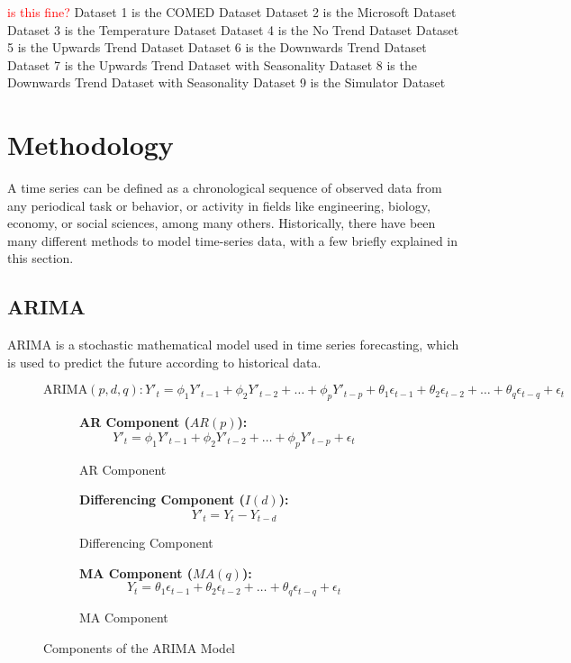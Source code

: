\documentclass[conference]{IEEEtran}
\begin{document}
\textcolor{red}{is this fine?}
Dataset 1 is the COMED Dataset
Dataset 2 is the Microsoft Dataset
Dataset 3 is the Temperature Dataset
Dataset 4 is the No Trend Dataset
Dataset 5 is the Upwards Trend Dataset
Dataset 6 is the Downwards Trend Dataset
Dataset 7 is the Upwards Trend Dataset with Seasonality
Dataset 8 is the Downwards Trend Dataset with Seasonality
Dataset 9 is the Simulator Dataset

\section{Methodology}

A time series can be defined as a chronological sequence of observed data from any periodical task or behavior, or activity in fields like engineering, biology, economy, or social sciences, among many others. Historically, there have been many different methods to model time-series data, with a few briefly explained in this section. 

\subsection{ARIMA}
ARIMA is a stochastic mathematical model used in time series forecasting, which is used to predict the future according to historical data.

\begin{figure}[ht]
  \begin{equation}
    \text{ARIMA}(p, d, q): Y'_t = \phi_1 Y'_{t-1} + \phi_2 Y'_{t-2} + \ldots + \phi_p Y'_{t-p} + \theta_1 \epsilon_{t-1} + \theta_2 \epsilon_{t-2} + \ldots + \theta_q \epsilon_{t-q} + \epsilon_t
  \end{equation}
\end{figure}

\begin{figure}[ht]
  \begin{subfigure}{0.5\textwidth}
    \centering
    \textbf{AR Component ($AR(p)$):}
    \[ Y'_t = \phi_1 Y'_{t-1} + \phi_2 Y'_{t-2} + \ldots + \phi_p Y'_{t-p} + \epsilon_t \]
    \caption{AR Component}
  \end{subfigure}%
  \begin{subfigure}{0.5\textwidth}
    \centering
    \textbf{Differencing Component ($I(d)$):}
    \[ Y'_t = Y_t - Y_{t-d} \]
    \caption{Differencing Component}
  \end{subfigure}

  \begin{subfigure}{\textwidth}
    \centering
    \textbf{MA Component ($MA(q)$):}
    \[ Y_t = \theta_1 \epsilon_{t-1} + \theta_2 \epsilon_{t-2} + \ldots + \theta_q \epsilon_{t-q} + \epsilon_t \]
    \caption{MA Component}
  \end{subfigure}

  \caption{Components of the ARIMA Model}
\end{figure}
\end{document}
